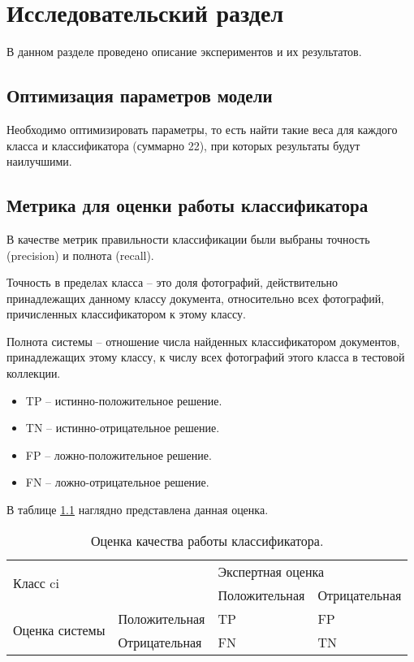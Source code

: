 \chapter{\textbf{Исследовательский раздел}}

В данном разделе проведено описание экспериментов и их результатов.

\section{Оптимизация параметров модели}

Необходимо оптимизировать параметры, то есть найти такие веса для каждого класса и классификатора (суммарно 22), при которых результаты будут наилучшими.

\section{Метрика для оценки работы классификатора}

В качестве метрик правильности классификации были выбраны точность (precision) и полнота (recall). 

Точность в пределах класса -- это доля фотографий, действительно принадлежащих данному классу документа, относительно всех фотографий, причисленных классификатором к этому классу. 

Полнота системы -- отношение числа найденных классификатором документов, принадлежащих этому классу, к числу всех фотографий этого класса в тестовой коллекции.

\begin{itemize}
\item TP -- истинно-положительное решение.
\item TN -- истинно-отрицательное решение.
\item FP -- ложно-положительное решение.
\item FN -- ложно-отрицательное решение.
\end{itemize}

В таблице \ref{table:metrics} наглядно представлена данная оценка.

\begin{table}[H]
\caption{Оценка качества работы классификатора. }
\begin{tabular}{|l|l|l|l|}
\hline
\multicolumn{2}{|l|}{\multirow{2}{*}{Класс ci}} & \multicolumn{2}{l|}{Экспертная оценка} \\ \cline{3-4} 
\multicolumn{2}{|l|}{} & Положительная      & Отрицательная     \\ \hline
\multirow{2}{*}{Оценка системы} & Положительная & TP & FP \\ \cline{2-4} 
 & Отрицательная & FN & TN \\ \hline
\end{tabular}
\label{table:metrics}
\end{table}

